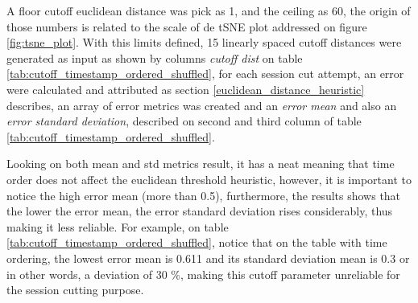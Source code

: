 \documentclass[ecp,tc,english]{iiufrgs}
\begin{document}
        A floor cutoff euclidean distance was pick as 1, and the ceiling as 60, the origin of those numbers is related to the scale of de tSNE plot addressed on figure \ref{fig:tsne_plot}. With this limits defined, 15 linearly spaced cutoff distances were generated as input as shown by columns \textit{cutoff dist} on table \ref{tab:cutoff_timestamp_ordered_shuffled}, for each session cut attempt, an error were calculated and attributed as section \ref{euclidean_distance_heuristic} describes, an array of error metrics was created and an \textit{error mean} and also an \textit{error standard deviation}, described on second and third column of table \ref{tab:cutoff_timestamp_ordered_shuffled}.
        
        Looking on both mean and std metrics result, it has a neat meaning that time order does not affect the euclidean threshold heuristic, however, it is important to notice the high error mean (more than 0.5), furthermore, the results shows that the lower the error mean, the error standard deviation rises considerably, thus making it less reliable. For example, on table \ref{tab:cutoff_timestamp_ordered_shuffled}, notice that on the table with time ordering, the lowest error mean is 0.611 and its standard deviation mean is 0.3 or in other words, a deviation of 30 \%, making this cutoff parameter unreliable for the session cutting purpose.
        
\end{document}

